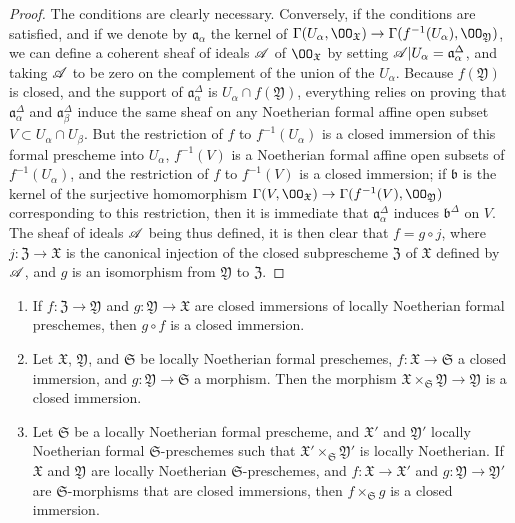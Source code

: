 \begin{proof}
\label{proof-1.10.14.4}
The conditions are clearly necessary.
Conversely, if the conditions are satisfied, and if we denote by $\mathfrak{a}_\alpha$ the kernel of $\Gamma(U_\alpha,\OO_\mathfrak{X})\to\Gamma(f^{-1}(U_\alpha),\OO_\mathfrak{Y})$, we can define a coherent sheaf of ideals $\mathscr{A}$ of $\OO_\mathfrak{X}$ by setting $\mathscr{A}|U_\alpha=\mathfrak{a}_\alpha^\Delta$, and taking $\mathscr{A}$ to be zero on the complement of the union of the $U_\alpha$.
Because $f(\mathfrak{Y})$ is closed, and the support of $\mathfrak{a}_\alpha^\Delta$ is $U_\alpha\cap f(\mathfrak{Y})$, everything relies on proving that $\mathfrak{a}_\alpha^\Delta$ and $\mathfrak{a}_\beta^\Delta$ induce the same sheaf on any Noetherian formal affine open subset $V\subset U_\alpha\cap U_\beta$.
But the restriction of $f$ to $f^{-1}(U_\alpha)$ is a closed immersion of this formal prescheme into $U_\alpha$, $f^{-1}(V)$ is a Noetherian formal affine open subsets of $f^{-1}(U_\alpha)$, and the restriction of $f$ to $f^{-1}(V)$ is a closed immersion;
if $\mathfrak{b}$ is the kernel of the surjective homomorphism $\Gamma(V,\OO_\mathfrak{X})\to\Gamma(f^{-1}(V),\OO_\mathfrak{Y})$ corresponding to this restriction, then it is immediate  that $\mathfrak{a}_\alpha^\Delta$ induces $\mathfrak{b}^\Delta$ on $V$.
The sheaf of ideals $\mathscr{A}$ being thus defined, it is then clear that $f=g\circ j$, where $j:\mathfrak{Z}\to\mathfrak{X}$ is the canonical injection of the closed subprescheme $\mathfrak{Z}$ of $\mathfrak{X}$ defined by $\mathscr{A}$, and $g$ is an isomorphism from $\mathfrak{Y}$ to $\mathfrak{Z}$.
\end{proof}

\begin{prop}[10.14.5]
\label{1.10.14.5}
\medskip\noindent
\begin{enumerate}[label=\emph{(\roman*)}]
  \item If $f:\mathfrak{Z}\to\mathfrak{Y}$ and $g:\mathfrak{Y}\to\mathfrak{X}$ are closed immersions of locally Noetherian formal preschemes, then $g\circ f$ is a closed immersion.
  \item Let $\mathfrak{X}$, $\mathfrak{Y}$, and $\mathfrak{S}$ be locally Noetherian formal preschemes, $f:\mathfrak{X}\to\mathfrak{S}$ a closed immersion, and $g:\mathfrak{Y}\to\mathfrak{S}$ a morphism.
    Then the morphism $\mathfrak{X}\times_\mathfrak{S}\mathfrak{Y}\to\mathfrak{Y}$ is a closed immersion.
  \item Let $\mathfrak{S}$ be a locally Noetherian formal prescheme, and $\mathfrak{X}'$ and $\mathfrak{Y}'$ locally Noetherian formal $\mathfrak{S}$-preschemes such that $\mathfrak{X}'\times_\mathfrak{S}\mathfrak{Y}'$ is locally Noetherian.
    If $\mathfrak{X}$ and $\mathfrak{Y}$ are locally Noetherian $\mathfrak{S}$-preschemes, and $f:\mathfrak{X}\to\mathfrak{X}'$ and $g:\mathfrak{Y}\to\mathfrak{Y}'$ are $\mathfrak{S}$-morphisms that are closed immersions, then $f\times_\mathfrak{S}g$ is a closed immersion.
\end{enumerate}
\end{prop}

